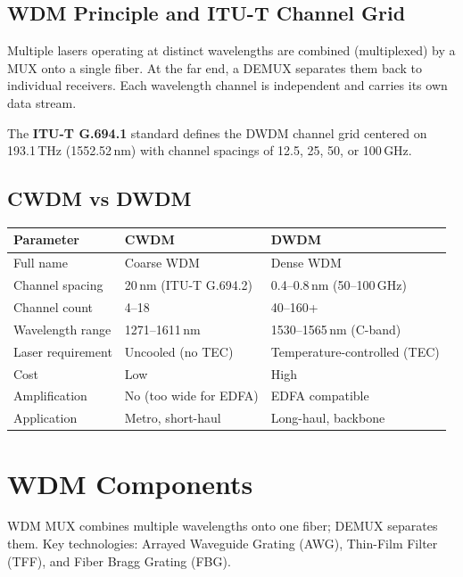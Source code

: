 \documentclass[12pt,a4paper]{article}
\renewcommand{\arraystretch}{1.45}
\begin{document}
\subsection{WDM Principle and ITU-T Channel Grid}
Multiple lasers operating at distinct wavelengths are combined (multiplexed) by a MUX onto a single fiber. At the far end, a DEMUX separates them back to individual receivers. Each wavelength channel is independent and carries its own data stream.

The \textbf{ITU-T G.694.1} standard defines the DWDM channel grid centered on 193.1\,THz (1552.52\,nm) with channel spacings of 12.5, 25, 50, or 100\,GHz.

\subsection{CWDM vs DWDM}
\par\noindent
{\renewcommand{\arraystretch}{1.55}
\begin{tabularx}{\linewidth}{|B{3.5cm}|Y|Y|}
\hline
\textbf{Parameter} & \textbf{CWDM} & \textbf{DWDM} \\
\hline
Full name & Coarse WDM & Dense WDM \\
\hline
Channel spacing & 20\,nm (ITU-T G.694.2) & 0.4--0.8\,nm (50--100\,GHz) \\
\hline
Channel count & 4--18 & 40--160+ \\
\hline
Wavelength range & 1271--1611\,nm & 1530--1565\,nm (C-band) \\
\hline
Laser requirement & Uncooled (no TEC) & Temperature-controlled (TEC) \\
\hline
Cost & Low & High \\
\hline
Amplification & No (too wide for EDFA) & EDFA compatible \\
\hline
Application & Metro, short-haul & Long-haul, backbone \\
\hline
\end{tabularx}}

\section{WDM Components}

\begin{tcolorbox}[defbox, title={\textbf{WDM MUX/DEMUX Devices}}]
WDM MUX combines multiple wavelengths onto one fiber; DEMUX separates them. Key technologies: Arrayed Waveguide Grating (AWG), Thin-Film Filter (TFF), and Fiber Bragg Grating (FBG).
\end{tcolorbox}
\end{document}
